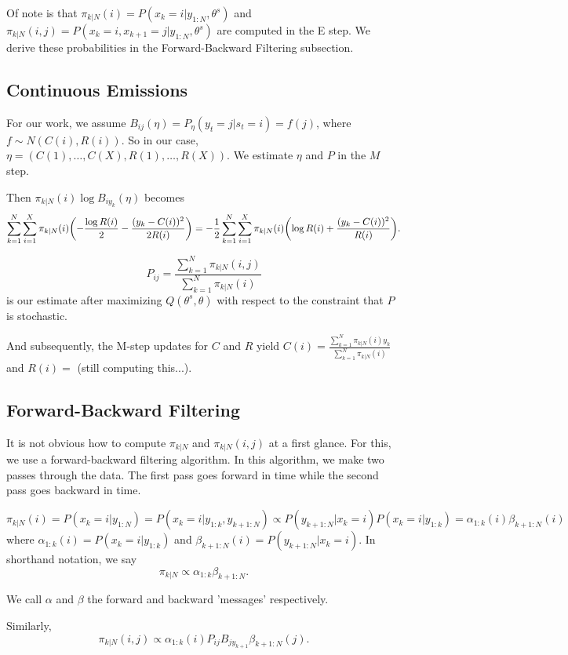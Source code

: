 \documentclass[english]{article}
\numberwithin{equation}{section}
\DeclarePairedDelimiter\paren{(}{)}           %
\begin{document}
	Of note is that $\pi_{k|N}(i)=P(x_k=i|y_{1:N},\theta^s)$ and $\pi_{k|N}(i,j)=P(x_k=i,x_{k+1}=j|y_{1:N},\theta^s)$ are computed in the E step. We derive these probabilities in the Forward-Backward Filtering subsection.
	
	\subsection*{Continuous Emissions}
	
	For our work, we assume $B_{ij}(\eta) = P_{\eta}(y_t=j|s_t=i) = f(j)$, where $f\sim N(C(i),R(i))$. So in our case, $\eta=(C(1),\ldots,C(X),R(1),\ldots,R(X))$. We estimate $\eta$ and $P$ in the $M$ step.
	
	Then $\pi_{k|N}(i)\log B_{iy_k}(\eta)$ becomes
	$$
	\sum_{k=1}^N \sum_{i=1}^X \pi_{k|N}(i)\paren*{-\frac{\log R(i)}{2}-\frac{(y_k-C(i))^2}{2R(i)}}=-\frac{1}{2}\sum_{k=1}^N \sum_{i=1}^X \pi_{k|N}(i)\paren*{\log R(i)+\frac{(y_k-C(i))^2}{R(i)}}.
	$$
		
	$$P_{ij}=\frac{\sum_{k=1}^N \pi_{k|N}(i,j)}{\sum_{k=1}^N \pi_{k|N}(i)}$$ is our estimate after maximizing $Q(\theta^{s},\theta)$ with respect to the constraint that $P$ is stochastic.
	
	And subsequently, the M-step updates for $C$ and $R$ yield
	$C(i) = \frac{\sum_{k=1}^N \pi_{k|N}(i)y_k}{\sum_{k=1}^N \pi_{k|N}(i)}$ and $R(i)=$ (still computing this...).
	
	\subsection*{Forward-Backward Filtering}
	
	It is not obvious how to compute $\pi_{k|N}$ and $\pi_{k|N}(i,j)$ at a first glance. For this, we use a forward-backward filtering algorithm. In this algorithm, we make two passes through the data. The first pass goes forward in time while the second pass goes backward in time.
	
	$$\pi_{k|N}(i)=P(x_k=i|y_{1:N})=P(x_k=i|y_{1:k},y_{k+1:N})\propto P(y_{k+1:N}|x_k=i)P(x_k=i|y_{1:k})=\alpha_{1:k}(i)\beta_{k+1:N}(i)$$ where $\alpha_{1:k}(i) = P(x_k=i|y_{1:k})$ and $\beta_{k+1:N}(i)=P(y_{k+1:N}|x_k=i)$. In shorthand notation, we say $$\pi_{k|N}\propto \alpha_{1:k}\beta_{k+1:N}.$$
	
	We call $\alpha$ and $\beta$ the forward and backward 'messages' respectively.
	
	Similarly, $$\pi_{k|N}(i,j)\propto \alpha_{1:k}(i)P_{ij}B_{jy_{k+1}}\beta_{k+1:N}(j).$$
	
\end{document}
